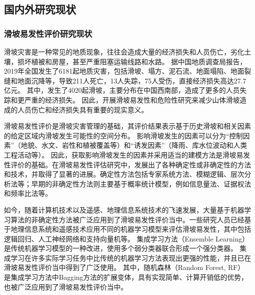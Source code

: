 \documentclass[a4paper,zihao=-4]{article}
\begin{document}
\subsection{国内外研究现状}

\subsubsection{滑坡易发性评价研究现状}

滑坡灾害是一种常见的地质现象，往往会造成大量的经济损失和人员伤亡，劣化土壤，损坏植被和房屋，甚至严重阻塞运输线路和水路\cite{Saro2016,Akgun2007,Zou2017}。
据中国地质调查局报告，2019年全国发生了6181起地质灾害，包括滑坡、塌方、泥石流、地面塌陷、地面裂缝和地面沉降等，导致211人死亡，13人失踪，75人受伤，直接经济损失高达27.7亿元。
其中，发生了4020起滑坡，主要分布在中国西南部，造成了更多的人员失踪和更严重的经济损失。
因此，开展滑坡易发性和危险性研究来减少山体滑坡造成的人员伤亡和经济损失具有重要的现实意义。

滑坡易发性评价是滑坡灾害管理的基础，其评价结果表示基于历史滑坡和相关因素的给定区域内滑坡发生可能性的空间分布\cite{pourghasemi2018analysis,Song2018,Yu2016_GWR_SVM}。
影响滑坡发生的因素可以分为“控制因素”（地貌、水文、岩性和植被覆盖等）和“诱发因素”（降雨、库水位波动和人类工程活动等）\cite{Rabby2020,Arabameri2020}。
因此，获取影响滑坡发生的因素并采用适当的建模方法是滑坡易发性评价的基础。在滑坡易发性评估研究中，发展出了各种确定性或非确定性的方法和技术，并取得了显著的进展\cite{Yu2016_GWR_SVM,Xu2016}。确定性方法包括专家系统方法\cite{Zhu2014AnLSM_fuzzy_logic}、模糊逻辑\cite{Aksoy2012,Anbalagan2015,Shahabi2015RemoteLSM_fuzzy_logic,Roy2019a,Reichenbach2018,Pradhan2011UseLSM_fuzzy_logic,Amirahmadi2016,Kumar2015}、层次分析法\cite{Yoshimatsu2006,Hung2015,Yalcin2011}等；早期的非确定性方法则主要基于概率统计模型，例如信息量法\cite{chen2016comparison_LSM_INFORVALUE}、证据权法\cite{Ozdemir2013ALSM_FR_WE_LR}和频率比法\cite{Goetz2015}等。

如今，随着计算机技术以及遥感、地理信息系统技术的飞速发展，大量基于机器学习算法的非确定性方法被广泛应用到了滑坡易发性评价当中。一些研究人员已经基于地理信息系统和遥感技术应用不同的机器学习模型来评估滑坡易发性，其中包括逻辑回归\cite{Bai2010,ayalew2005application,Yilmaz2009,Akgun2012LSM_LR_MCD_FR,Yesilnacar2005,Eeckhaut2006,Lee2007LSM_FR_LR_ANN,Chauhan2010LSM_LR}、人工神经网络\cite{Lee2020,Ghorbanzadeh2019,2010Landslide}和支持向量机\cite{Othman2014,Adnan2020,Dou2019,Shao2019}等。
集成学习方法（Ensemble Learning）是传统机器学习模型的一种改进，使用多个弱分类器联合形成一个强分类器。
集成学习在许多实际学习任务中比传统的机器学习方法表现出更强的性能，并且已在滑坡易发性评价当中得到了广泛使用\cite{Kadavi2018,Adnan2020,Napoli2020}。
其中，随机森林（Random Forest, RF）是集成学习方法中Bagging方法的扩展变体\cite{Breiman2001}，具有实现简单、计算开销低的优势，也被广泛应用到了滑坡易发性评价当中\cite{Youssef2015,Pourghasemi2016,Kim2017}。 
\end{document}
